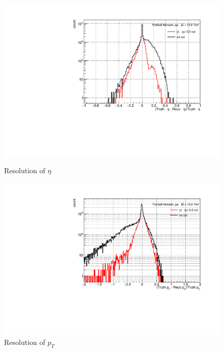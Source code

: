             \begin{figure}[H]
                \centering
                    \begin{minipage}{0.45\textwidth}
                        \centering
                        \includegraphics[width=\textwidth]{fig/3_5_6_reso_eta.pdf} 
                        \caption{Resolution of $\eta$}
                        \label{Analysis:Matching:pt resolution}
                    \end{minipage}
                    \begin{minipage}{0.45\textwidth}
                        \centering
                        \includegraphics[width=\textwidth]{fig/3_5_6_reso_pt.pdf} 
                        \caption{Resolution of $p_T$}
                        \label{Analysis:Matching:eta resolution}
                    \end{minipage}
                \end{figure}
